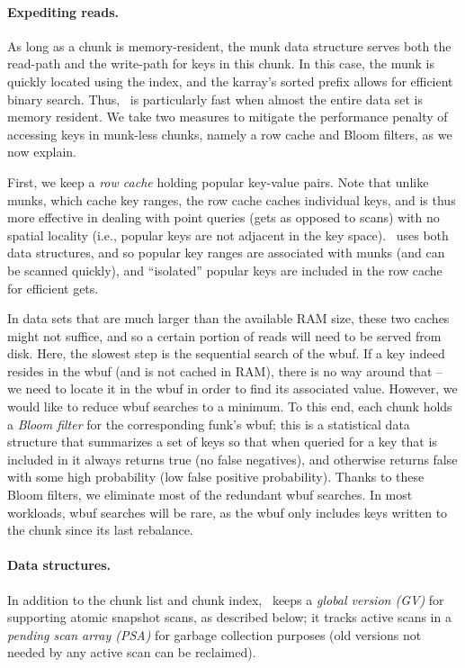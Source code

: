 \paragraph{Expediting reads.}
As long as a chunk  is memory-resident, the munk data structure serves both the read-path and the write-path for keys in this chunk. 
In this case, the munk is quickly located using the index, and the karray's sorted prefix allows for efficient binary search.
Thus, \sys\ is particularly fast when almost the entire data set is memory resident. 
We take two measures to mitigate the performance penalty of accessing keys in munk-less   chunks, namely 
a row cache and Bloom filters, as we now explain.

First, we keep a \emph{row cache} holding popular key-value pairs. Note that unlike munks, which cache key ranges, the row
cache caches individual keys, and is thus more effective in dealing with point queries (gets as opposed to scans) with no
spatial locality (i.e., popular keys are not adjacent in the key space). \sys\ uses both data structures, and so 
popular key ranges are associated with munks (and can be scanned quickly), 
and  ``isolated'' popular keys are included in the row cache for efficient gets.

In data sets that are much larger than the available RAM size, these two caches might not suffice, and so a certain portion of 
reads will need to be served from disk. Here, the slowest step is the sequential search of the wbuf. 
If a key indeed resides in the wbuf (and is not cached in RAM), there is no way around that -- we need to locate it in the wbuf in order to find
its associated value. However, we would like to reduce wbuf searches to a minimum. 
To this end, each chunk holds a \emph{Bloom filter} for the corresponding funk's wbuf; 
this is a statistical data structure that summarizes a set of keys so that 
when queried for a key that is included in it always returns true (no false negatives), 
and otherwise returns false with some high probability (low false positive probability). 
Thanks to these Bloom filters, we eliminate most of the redundant wbuf searches.
In most workloads, wbuf searches will be rare, as the wbuf only includes keys written to the chunk 
since its last rebalance.

\paragraph{Data structures.}

In addition to the chunk list and chunk index, \sys\ keeps a \emph{global version (GV)} for supporting atomic snapshot scans,
as described below; it tracks active scans in a \emph{pending scan array (PSA)} for garbage collection purposes (old 
versions not needed by any active scan can be reclaimed).

